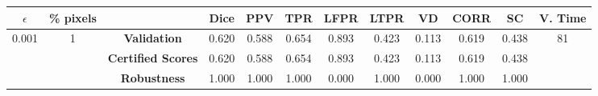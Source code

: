 \begin{longtable}{ c  c | c | c  c  c  c  c  c  c c c}
\toprule \textbf{$\epsilon$} & \textbf{\% pixels} & & \textbf{Dice} & \textbf{PPV} & \textbf{TPR} & \textbf{LFPR} & \textbf{LTPR} & \textbf{VD} & \textbf{CORR} & \textbf{SC} & \textbf{V. Time} \\
\midrule 
\multirow{3}{*}{0.001}  & \multirow{3}{*}{1} &\textbf{Validation} & 0.620 & 0.588 & 0.654 & 0.893 & 0.423 & 0.113 & 0.619 & 0.438 & \multirow{3}{*}{81} \\
 & & \textbf{Certified Scores} & 0.620 & 0.588 & 0.654 & 0.893 & 0.423 & 0.113 & 0.619 & 0.438 & \\
& & \textbf{Robustness} & 1.000 & 1.000 & 1.000 & 0.000 & 1.000 & 0.000 & 1.000 & 1.000 & \\
\end{longtable}